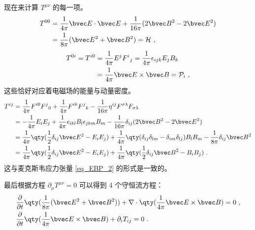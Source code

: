 现在来计算 $T^{\mu\nu}$ 的每一项。
\begin{equation}\label{eq_EMtens_2}
\begin{aligned}
T^{00}&=\frac{1}{4\pi}\bvec E \cdot \bvec E+\frac{1}{16\pi}(2\bvec B^2-2\bvec E^2)\\
&=\frac{1}{8\pi}(\bvec E^2+\bvec B^2)=\mathcal{H}~,
\end{aligned}
\end{equation}
\begin{equation}\label{eq_EMtens_3}
\begin{aligned}
T^{0i}=T^{i0}&=\frac{1}{4\pi}E^j F^i{}_j=\frac{1}{4\pi}\epsilon_{ijk}E_jB_k\\
&=\frac{1}{4\pi}\bvec E\times \bvec B=\mathcal{P}_i~,
\end{aligned}
\end{equation}
这些恰好对应着电磁场的能量与动量密度。
\begin{equation}\label{eq_EMtens_4}
\begin{aligned}
T^{ij}&=\frac{1}{4\pi}F^{i0}F^j{}_0+\frac{1}{4\pi}F^{ik}F^j{}_k-\frac{1}{16\pi}\eta^{ij}F^{\sigma\lambda}F_{\sigma\lambda}\\
&=-\frac{1}{4\pi}E_iE_j+\frac{1}{4\pi}\epsilon_{ikl}B_l \epsilon_{jkm}B_m-\frac{1}{16\pi}\delta_{ij}(2\bvec B^2-2\bvec E^2)\\
&=\frac{1}{4\pi}\qty(\frac{1}{2}\delta_{ij}\bvec E^2-E_iE_j)+\frac{1}{4\pi}\qty(\delta_{ij}\delta_{lm}-\delta_{im}\delta_{lj})B_lB_m-\frac{1}{8\pi}\delta_{ij}\bvec B^2\\
&=\frac{1}{4\pi}\qty(\frac{1}{2}\delta_{ij}\bvec E^2-E_iE_j)+\frac{1}{4\pi}\qty(\frac{1}{2}\delta_{ij}\bvec B^2 - B_iB_j)~.
\end{aligned}
\end{equation}
这与麦克斯韦应力张量 \autoref{eq_EBP_2}  的形式是一致的。

最后根据方程 $\partial_\mu T^{\mu\nu}=0$ 可以得到 4 个守恒流方程：
\begin{equation}
\begin{aligned}
&\frac{\partial }{\partial t}\qty(\frac{1}{8\pi}(\bvec E^2+\bvec B^2))+\nabla \cdot \qty(\frac{1}{4\pi}\bvec E\times \bvec B)=0~,\\
&\frac{\partial}{\partial t}\qty(\frac{1}{4\pi}\bvec E\times \bvec B)+\partial_i T_{ij}=0~.
\end{aligned}
\end{equation}

